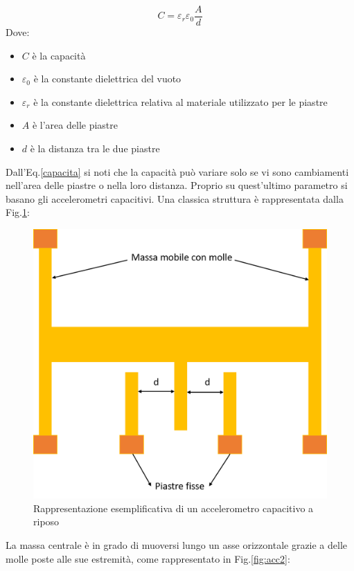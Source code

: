 \begin{equation}
\label{capacita}
C = \varepsilon_r \varepsilon_0 \dfrac{A}{d} 
\end{equation}
Dove:
\begin{itemize}
	\item $C$ è la capacità
	\item $\varepsilon_0$ è la constante dielettrica del vuoto
	\item $\varepsilon_r$ è la constante dielettrica relativa al materiale utilizzato per le piastre
	\item $A$ è l'area delle piastre
	\item $d$ è la distanza tra le due piastre
\end{itemize}
Dall'Eq.\ref{capacita} si noti che la capacità può variare solo se vi sono cambiamenti nell'area delle piastre o nella loro distanza. Proprio su quest'ultimo parametro si basano gli accelerometri capacitivi. Una classica struttura è rappresentata dalla Fig.\ref{fig:acc1}:
 \begin{figure}[H]  
	\centering 
	\includegraphics[scale=0.25 ]{tecnologie/acc1.png}
	\caption{Rappresentazione esemplificativa di un accelerometro capacitivo a riposo}
	\label{fig:acc1}
\end{figure}
La massa centrale è in grado di muoversi lungo un asse orizzontale grazie a delle molle poste alle sue estremità, come rappresentato in Fig.\ref{fig:acc2}:
